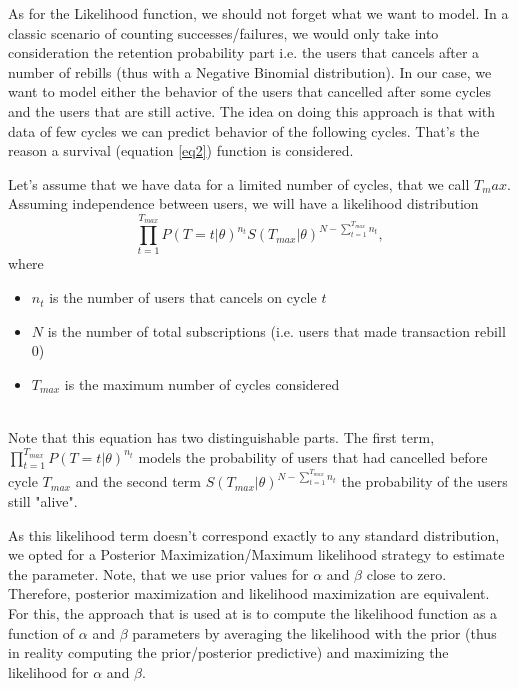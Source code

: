 \documentclass[paper=a4, fontsize=11pt]{scrartcl} %
\numberwithin{equation}{section} %
\numberwithin{figure}{section} %
\numberwithin{table}{section} %
\begin{document}
As for the Likelihood function, we should not forget what we want to model. In a classic scenario of counting successes/failures, we would only take into consideration the retention probability part i.e. the users that cancels after a number of rebills (thus with a Negative Binomial distribution). In our case, we want to model either the behavior of the users that cancelled after some cycles and the users that are still active. The idea on doing this approach is that with data of few cycles we can predict behavior of the following cycles. That's the reason a survival (equation \ref{eq2}) function is considered.

Let's assume that we have data for a limited number of cycles, that we call $T_max$. Assuming independence between users, we will have a likelihood distribution\\ 
\begin{equation} \label{eq4}
\prod_{t=1}^{T_{max}}P(T=t | \theta)^{n_t}S(T_{max} | \theta)^{N-\sum_{t=1}^{T_{max}}n_t},
\end{equation}
where
 \begin{itemize}
  \item  $n_t$ is the number of users that cancels on cycle $t$
  \item  $N$ is the number of total subscriptions (i.e. users that made transaction rebill 0)
  \item  $T_{max}$ is the maximum number of cycles considered
\end{itemize}
 \hfill\\
 
Note that this equation has two distinguishable parts.
The first term, 
$
\prod_{t=1}^{T_{max}}P(T=t | \theta)^{n_t}
$
models the probability of users that had cancelled before cycle $T_{max}$ and the second term $S(T_{max} | \theta)^{N-\sum_{t=1}^{T_{max}}n_t}$  the probability of the users still "alive". 

As this likelihood term doesn't correspond exactly to any standard distribution, we opted for a Posterior Maximization/Maximum likelihood strategy to estimate the parameter. Note, that we use prior values for $\alpha$ and $\beta$ close to zero. Therefore, posterior maximization and likelihood maximization are equivalent. For this, the approach that is used at \cite{feder07} is to compute the likelihood function as a function of $\alpha$ and $\beta$ parameters by averaging the likelihood with the prior (thus in reality computing the prior/posterior predictive) and maximizing the likelihood for $\alpha$ and $\beta$. 
\end{document}

